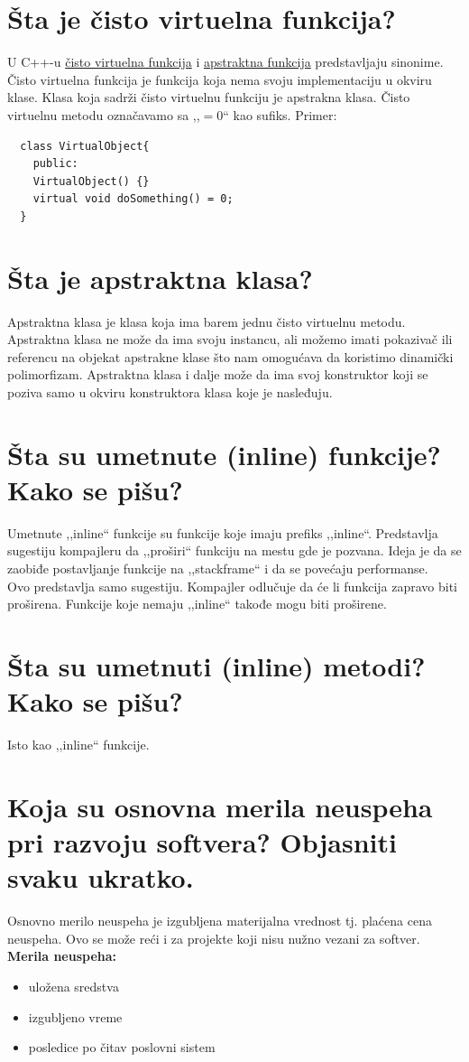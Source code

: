 \documentclass[a4paper]{article}
\begin{document}
\section{Šta je čisto virtuelna funkcija?}
  U C++-u \underline{čisto virtuelna funkcija} i \underline{apstraktna funkcija} predstavljaju 
  sinonime. Čisto virtuelna funkcija
  je funkcija koja nema svoju implementaciju u okviru klase. Klasa koja sadrži čisto virtuelnu funkciju
  je apstrakna klasa. Čisto virtuelnu metodu označavamo sa ,,$= 0$`` kao sufiks.
  Primer:
  \begin{lstlisting}
  class VirtualObject{
    public:
    VirtualObject() {}
    virtual void doSomething() = 0;
  }\end{lstlisting}

\section{Šta je apstraktna klasa?}
  Apstraktna klasa je klasa koja ima barem jednu čisto virtuelnu metodu. Apstraktna klasa ne može da
  ima svoju instancu, ali možemo imati pokazivač ili referencu na objekat apstrakne klase što nam
  omogućava da koristimo dinamički polimorfizam. Apstraktna klasa i dalje može da ima svoj konstruktor
  koji se poziva samo u okviru konstruktora klasa koje je nasleđuju.

\section{Šta su umetnute (inline) funkcije? Kako se pišu?}
  Umetnute ,,inline`` funkcije su funkcije koje imaju prefiks ,,inline``. Predstavlja sugestiju kompajleru
  da ,,proširi`` funkciju na mestu gde je pozvana. Ideja je da se zaobiđe postavljanje funkcije
  na ,,stackframe`` i da se povećaju performanse. \\
  \indent Ovo predstavlja samo sugestiju. Kompajler odlučuje da će li funkcija zapravo biti proširena. 
  Funkcije koje nemaju ,,inline`` takođe mogu biti proširene.

\section{Šta su umetnuti (inline) metodi? Kako se pišu?}
  Isto kao ,,inline`` funkcije.
  
\section{Koja su osnovna merila neuspeha pri razvoju softvera? Objasniti svaku ukratko.}
  Osnovno merilo neuspeha je izgubljena materijalna vrednost tj. plaćena cena neuspeha. Ovo se
  može reći i za projekte koji nisu nužno vezani za softver. \\
  \textbf{Merila neuspeha:}
  \begin{itemize}
    \item uložena sredstva 
    \item izgubljeno vreme 
    \item posledice po čitav poslovni sistem 
  \end{itemize}
\end{document}
